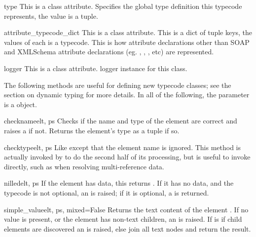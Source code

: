 \begin{memberdesc}{type}
This is a class attribute.
Specifies the global type definition this typecode represents, the value is
a  tuple.
\end{memberdesc}

\begin{memberdesc}{attribute_typecode_dict}
This is a class attribute.
This is a dict of  tuple keys, the values of each is a
typecode.  This is how attribute declarations other than SOAP and XMLSchema
attribute declarations (eg. , , , etc) are
represented.
\end{memberdesc}

\begin{memberdesc}{logger}
This is a class attribute.
logger instance for this class.
\end{memberdesc}

The following methods are useful for defining new typecode classes;
see the section on dynamic typing for more details.  In all of the following,
the  parameter is a  object.

\begin{methoddesc}{checkname}{elt, ps}
Checks if the name and type of the element  are
correct and raises a  if not.
Returns the element's type as a  tuple if so.
\end{methoddesc}

\begin{methoddesc}{checktype}{elt, ps}
Like  except that the element name is ignored.
This method is actually invoked by  to do the
second half of its processing, but is useful to invoke
directly, such as when resolving multi-reference data.
\end{methoddesc}

\begin{methoddesc}{nilled}{elt, ps}
If the element  has data, this returns .
If it has no data, and the typecode is not optional, an
 is raised; if it is optional,
a  is returned.
\end{methoddesc}

\begin{methoddesc}{simple_value}{elt, ps, mixed=False}
Returns the text content of the element .
If no value is present, or the element has non-text children, an
 is raised.  If  is  if
child elements are discovered an  is raised, else
join all text nodes and return the result.

\end{methoddesc}

